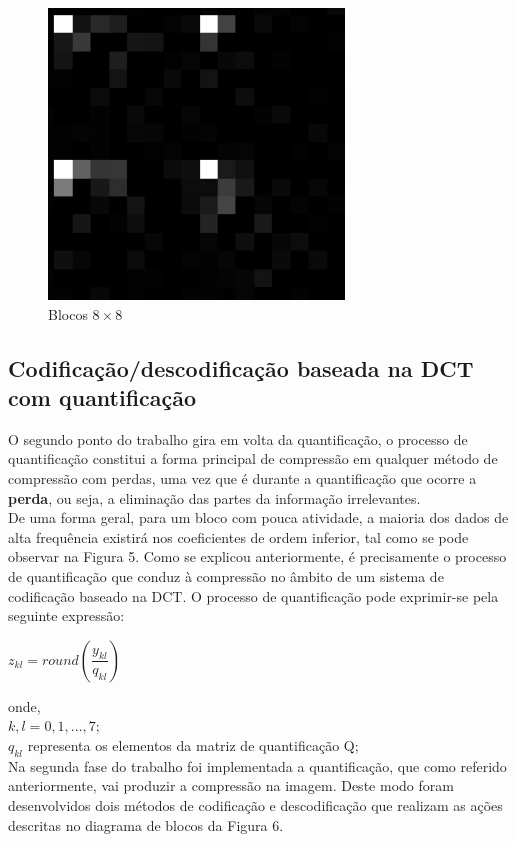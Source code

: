 \documentclass[12pt,a4paper]{article}
\begin{document}
\begin{figure}[h]
	\centering
    \begin{minipage}{0.45\textwidth}
        \centering
        \includegraphics[width=0.7\textwidth]{imagens/blocos.png}
        \caption{Blocos $8\times 8$}
    \end{minipage}\hfill
\end{figure}

\subsection{Codificação/descodificação baseada na DCT com quantificação}
O segundo ponto do trabalho gira em volta da quantificação, o processo de quantificação constitui a forma principal de compressão em qualquer método de compressão com perdas, uma vez que é durante a quantificação que ocorre a \textbf{perda}, ou seja, a eliminação das partes da informação irrelevantes.\\

De uma forma geral, para um bloco com pouca atividade, a maioria dos dados de alta frequência existirá nos coeficientes de ordem inferior, tal como se pode observar na Figura 5. Como se explicou anteriormente, é precisamente o processo de quantificação que conduz à compressão no âmbito de um sistema de codificação baseado na DCT. O processo de quantificação pode exprimir-se pela seguinte expressão:
\begin{center}
$z_{kl} = round(\dfrac{y_{kl}}{q_{kl}})$
\end{center}
onde,\\
\indent \indent $k,l = 0,1,...,7;$\\
\indent \indent $q_{kl}$ representa os elementos da matriz de quantificação Q;\\
\newpage
Na segunda fase do trabalho foi implementada a quantificação, que como referido anteriormente, vai produzir a compressão na imagem. Deste modo foram desenvolvidos dois métodos de codificação e descodificação que realizam as ações descritas no diagrama de blocos da Figura 6.
\end{document}
